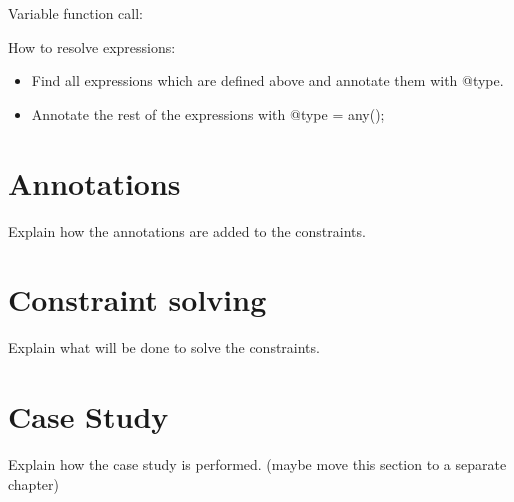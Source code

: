 \documentclass[../main.tex]{subfiles}
\begin{document}
    Variable function call:
    \begin{prooftree}
    \end{prooftree}    
    
    \hrulefill
    
    How to resolve expressions:
    \begin{itemize}
        \item Find all expressions which are defined above and annotate them with @type.
        \item Annotate the rest of the expressions with @type = any();
    \end{itemize}
    
    \section{Annotations}
    Explain how the annotations are added to the constraints.
    
    \section{Constraint solving}
    Explain what will be done to solve the constraints.
    \\
    
    \section{Case Study}
    Explain how the case study is performed. (maybe move this section to a separate chapter)
    \\
\end{document}
